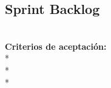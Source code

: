 \subsection{Sprint Backlog}
\userStory	{} %
	{} %
	{	\\
	\textbf{Criterios de aceptación:}\\
		* \\
		* \\
		* \\
	} %
	{} %
	{} %
	{} %
	{} %
	{} %


\vspace{20pt}

